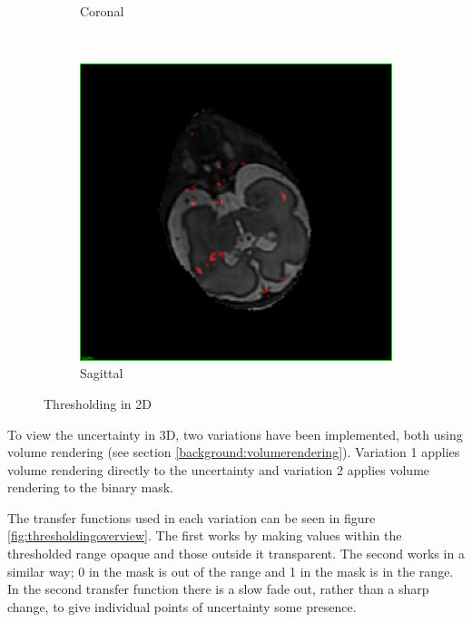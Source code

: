 \begin{figure}[H]
\begin{subfigure}[b]{0.3\textwidth}
    \caption{Coronal}
    \label{fig:thresholding2dcoronal}
  \end{subfigure}%
  ~ %
  \begin{subfigure}[b]{0.3\textwidth}
    \includegraphics[width=\textwidth]{images/thresholding/thresholding_2d_sagittal.png}
    \caption{Sagittal}
    \label{fig:thresholding2dsagittal}  
  \end{subfigure}
  \caption{Thresholding in 2D}\label{fig:thresholding2d}
\end{figure}

To view the uncertainty in 3D, two variations have been implemented, both using volume rendering (see section \ref{background:volumerendering}). Variation 1 applies volume rendering directly to the uncertainty and variation 2 applies volume rendering to the binary mask.

The transfer functions used in each variation can be seen in figure \ref{fig:thresholdingoverview}. The first works by making values within the thresholded range opaque and those outside it transparent. The second works in a similar way; 0 in the mask is out of the range and 1 in the mask is in the range. In the second transfer function there is a slow fade out, rather than a sharp change, to give individual points of uncertainty some presence.

